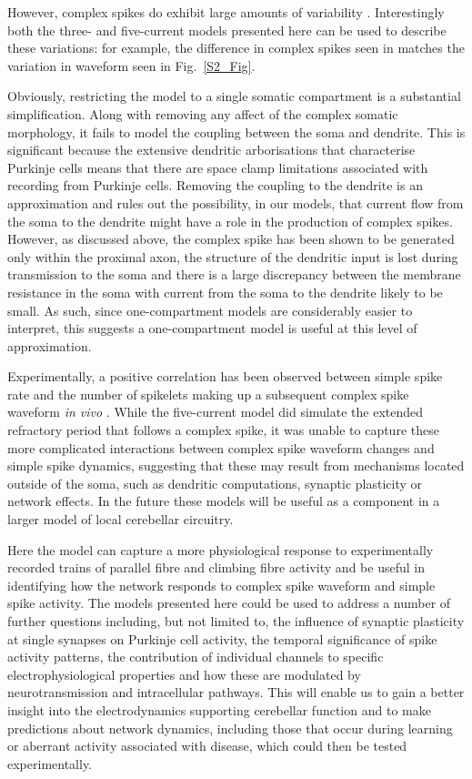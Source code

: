 \documentclass[utf8]{frontiersSCNS} %
\begin{document}
However, complex spikes do exhibit large amounts of variability
\cite{BurroughsEtAl2016, WarnaarEtAl2015}. Interestingly both the
three- and five-current models presented here can be
used to describe these variations: for example, the difference in
complex spikes seen in \cite{MonsivaisEtAl2005} matches the variation
in waveform seen in Fig.~\ref{S2_Fig}.

Obviously, restricting the model to a single somatic compartment is a
substantial simplification. Along with removing any affect of the
complex somatic morphology, it fails to model the coupling between the
soma and dendrite. This is significant because the extensive dendritic
arborisations that characterise Purkinje cells means that there are
space clamp limitations associated with recording from Purkinje
cells. Removing the coupling to the dendrite is an approximation and
rules out the possibility, in our models, that current flow from the
soma to the dendrite might have a role in the production of complex
spikes. However, as discussed above, the complex spike has been shown
to be generated only within the proximal axon, the structure of the
dendritic input is lost during transmission to the soma and there is a
large discrepancy between the membrane resistance in the soma with
current from the soma to the dendrite likely to be small. As such,
since one-compartment models are considerably easier to interpret,
this suggests a one-compartment model is useful at this level of
approximation.

Experimentally, a positive correlation has been observed between
simple spike rate and the number of spikelets making up a subsequent
complex spike waveform \textit{in vivo}
\cite{BurroughsEtAl2016}. While the five-current model did simulate
the extended refractory period that follows a complex spike, it was
unable to capture these more complicated interactions between complex
spike waveform changes and simple spike dynamics, suggesting that
these may result from mechanisms located outside of the soma, such as
dendritic computations, synaptic plasticity or network effects. In the
future these models will be useful as a component in a larger model of
local cerebellar circuitry.

Here the model can capture a more physiological response to
experimentally recorded trains of parallel fibre and climbing fibre
activity and be useful in identifying how the network responds to
complex spike waveform and simple spike activity. The models presented
here could be used to address a number of further questions including,
but not limited to, the influence of synaptic plasticity at single
synapses on Purkinje cell activity, the temporal significance of spike
activity patterns, the contribution of individual channels to specific
electrophysiological properties and how these are modulated by
neurotransmission and intracellular pathways. This will enable us to
gain a better insight into the electrodynamics supporting cerebellar
function and to make predictions about network dynamics, including
those that occur during learning or aberrant activity associated with
disease, which could then be tested experimentally.
\end{document}
